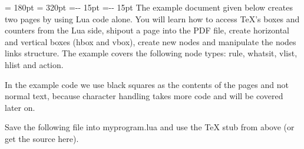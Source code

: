\ifdefined\ignorelinebreker\else

\fi

\pagewidth = 180pt
\pageheight = 320pt
\hoffset=-\dimexpr 1in- 15pt\relax
\voffset=-\dimexpr 1in- 15pt\relax
\hsize=150pt
The example document given below creates two pages by using Lua code alone. You will learn how to access TeX's boxes and counters from the Lua side, shipout a page into the PDF file, create horizontal and vertical boxes (hbox and vbox), create new nodes and manipulate the nodes links structure. The example covers the following node types: rule, whatsit, vlist, hlist and action.

In the example code we use black squares as the contents of the pages and not normal text, because character handling takes more code and will be covered later on.

Save the following file into myprogram.lua and use the TeX stub from above (or get the source here). 


\bye
